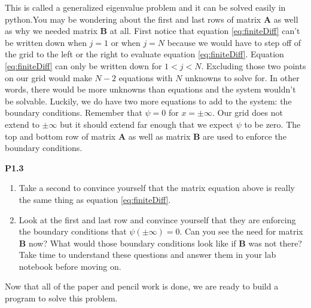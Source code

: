 This is called a generalized eigenvalue problem and it can be solved easily in
python.You may be wondering about the first and last rows of matrix
$\boldsymbol{A}$ as well as why we needed matrix $\boldsymbol{B}$ at
all. First notice that equation \eqref{eq:finiteDiff} can't be written
down when $j = 1$ or when $j = N$ because we would have to step off of
the grid to the left or the right to evaluate equation
\eqref{eq:finiteDiff}.  Equation \eqref{eq:finiteDiff} can only be
written down for $1 < j < N$. Excluding those two points on our grid
would make $N-2$ equations with $N$ unknowns to solve for. In other
words, there would be more unknowns than equations and the system
wouldn't be solvable. Luckily, we do have two more
equations to add to the system: the boundary conditions. Remember that $\psi = 0$
for $x = \pm \infty$.  Our grid does not extend to $\pm \infty$ but it
should extend far enough that we expect $\psi$ to be zero.  The top and bottom
row of matrix $\boldsymbol{A}$ as well as matrix $\boldsymbol{B}$ are
used to enforce the boundary conditions.

\vspace{0.25in}
\begin{minipage}{0.9\linewidth}
\noindent\textbf{P1.3} 
\begin{enumerate}
\item Take a second to convince yourself that the matrix equation
  above is really the same thing as equation \eqref{eq:finiteDiff}.
\item Look at the first and last row and convince yourself that they
  are enforcing the boundary conditions that $\psi(\pm\infty) = 0$.  Can you see the need for
  matrix $\boldsymbol{B}$ now?  What would those boundary conditions
  look like if $\boldsymbol{B}$ was not there?  Take time to
  understand these questions and answer them in your lab notebook
  before moving on.
\end{enumerate}
\end{minipage}
\vspace{0.25in}

Now that all of the paper and pencil work is done, we are ready to
build a program to solve this problem. 
\vspace{0.25in}


